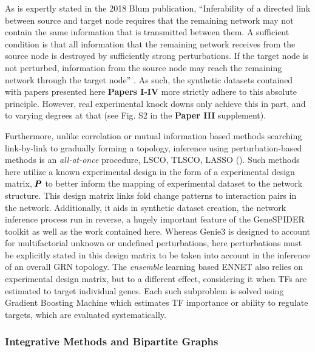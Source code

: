 As is expertly stated in the 2018 Blum \etal publication, ``Inferability of a directed link between source and target node requires that the remaining network may not contain the same information that is transmitted between them. A sufficient condition is that all information that the remaining network receives from the source node is destroyed by sufficiently strong perturbations. If the target node is not perturbed, information from the source node may reach the remaining network through the target node'' \citep{blum2018experimental}. As such, the synthetic datasets contained with papers presented here \textbf{Papers I-IV} more strictly adhere to this absolute principle. However, real experimental knock downs only achieve this in part, and to varying degrees at that (see Fig. S2 in the \textbf{Paper III} supplement).

Furthermore, unlike correlation or mutual information based methods searching link-by-link to gradually forming a topology, inference using perturbation-based methods is an {\it all-at-once} procedure, \ie LSCO, TLSCO, LASSO (). Such methods here utilize a known experimental design in the form of a experimental design matrix, \ie ${\pmb{P}}$ to better inform the mapping of experimental dataset to the network structure. This design matrix links fold change patterns to interaction pairs in the network. Additionally, it aids in synthetic dataset creation, the network inference process run in reverse, a hugely important feature of the GeneSPIDER toolkit as well as the work contained here. Whereas Genie3 is designed to account for multifactorial unknown or undefined perturbations, here perturbations must be explicitly stated in this design matrix to be taken into account in the inference of an overall GRN topology. 
The \emph{ensemble} learning based ENNET \citep{slawek2013ennet} also relies on experimental design matrix, but to a different effect, considering it when TFs are estimated to target individual genes. Each such subproblem is solved using Gradient Boosting Machine which estimates TF importance or ability to regulate targets, which are evaluated systematically.

\subsubsection{Integrative Methods and Bipartite Graphs}
\label{sec:bipart}

